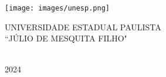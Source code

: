 
\thispagestyle{empty}

\begin{minipage}[c]{0.3\textwidth}
\texttt{[image: images/unesp.png]}
\end{minipage}
\hspace{10pt}
\begin{minipage}[c]{0.6\textwidth}
\uppercase{Universidade Estadual Paulista \\``Júlio de Mesquita Filho"}
\end{minipage}

\vspace{1cm}

\begin{center}
    \nome
\end{center}

\vspace{5cm}

\begin{center}
    \titulo
\end{center}

\vspace*{\fill}

\begin{center}
    \uppercase{\cidade\\2024}
\end{center}